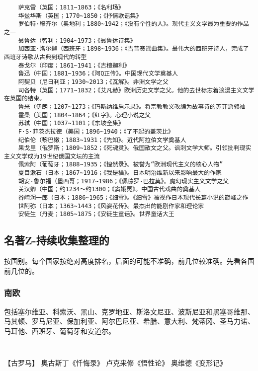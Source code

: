 \documentclass[UTF8]{../RepresentationUniverse}
\begin{document}
\begin{lstlisting}
    萨克雷（英国；1811~1863；《名利场》
    华兹华斯（英国；1770~1850；《抒情歌谣集》
    罗伯特·穆齐尔（奥地利；1880~1942；《没有个性的人》。现代主义文学最为重要的作品之一
    聂鲁达（智利；1904~1973；《聂鲁达诗集》
    加西亚·洛尔迦（西班牙；1898~1936；《吉普赛谣曲集》。最伟大的西班牙诗人，完成了西班牙诗歌从古典到现代的转型
    泰戈尔（印度；1861~1941；《吉檀迦利》
    鲁迅（中国；1881~1936；《阿Q正传》。中国现代文学奠基人
    阿契贝（尼日利亚；1930~2013；《瓦解》。非洲文学之父
    司各特（英国；1771~1832；《艾凡赫》欧洲历史文学之父。他的去世标志着浪漫主义文学在英国的结束。
    鲁米（伊朗；1207~1273；《玛斯纳维启示录》。将宗教教义改编为故事诗的苏菲派领袖
    霍桑（美国；1804~1864；《红字》。心理小说之父
    苏轼（中国；1037~1101；《东坡全集》
    F·S·菲茨杰拉德（美国；1896~1940；《了不起的盖茨比》
    纪伯伦（黎巴嫩；1883~1931；《先知》。近代阿拉伯文学奠基人
    果戈里（俄罗斯；1809~1852；《死魂灵》。俄国散文之父。讽刺文学大师。引领批判现实主义文学成为19世纪俄国文坛的主流
    佩索阿（葡萄牙；1888~1935；《惶然录》。被誉为“欧洲现代主义的核心人物”
    夏目漱石（日本；1867~1916；《我是猫》。日本明治维新以来影响最大的作家
    胡安·鲁尔福（墨西哥；1917~1986；《佩德罗·巴拉莫》。魔幻现实主义文学之父
    关汉卿（中国；约1234～约1300；《窦娥冤》。中国古代戏曲的奠基人
    谷崎润一郎（日本；1886~1965；《细雪》。《细雪》被视作日本现代长篇小说的巅峰之作
    世阿弥（日本；1363~1443；《风姿花传》。最杰出的能剧作家和理论家
    安徒生（丹麦；1805~1875；《安徒生童话》。世界童话大王
\end{lstlisting}



\subsection{名著Z-持续收集整理的}

按国别。每个国家按绝对高度排名，后面的可能不准确，前几位较准确。先看各国前几位的。

\subsubsection{南欧}
包括塞尔维亚、科索沃、黑山、克罗地亚、斯洛文尼亚、波斯尼亚和黑塞哥维那、马其顿、罗马尼亚、保加利亚、阿尔巴尼亚、希腊、意大利、梵蒂冈、圣马力诺、马耳他、西班牙、葡萄牙和安道尔。
\begin{lstlisting}
   
\end{lstlisting}
【古罗马】
奥古斯丁《忏悔录》
卢克来修《悟性论》
奥维德《变形记》
\end{document}
